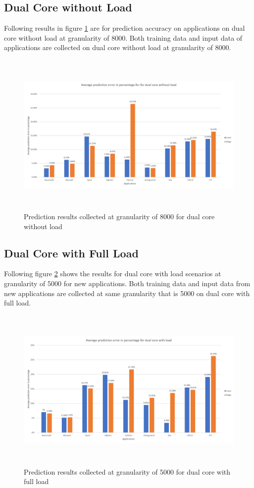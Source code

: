 \subsection{Dual Core without Load}
Following results in figure \ref{fig:r_dual_no} are for prediction accuracy on applications on dual core without load at granularity of 8000. Both training data and input data of applications are collected on dual core without load at granularity of 8000. 

\begin{figure}[h!]
\includegraphics[width=12cm, height=8cm]{./images/result_noload}
\centering
\caption{Prediction results collected at granularity of 8000 for dual core without load}
\label{fig:r_dual_no}
\end{figure}

\subsection{Dual Core with Full Load}
Following figure \ref{fig:r_dual_full} shows the results for dual core with load scenarios at granularity of 5000 for new applications. Both training data and input data from new applications are collected at same granularity that is 5000 on dual core with full load.

\begin{figure}[h!]
\includegraphics[width=12cm, height=8cm]{./images/result_fullload}
\centering
\caption{Prediction results collected at granularity of 5000 for dual core with full load}
\label{fig:r_dual_full}
\end{figure}

